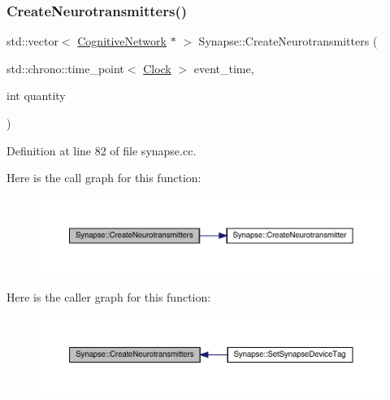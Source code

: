 \subsubsection{\texorpdfstring{Create\+Neurotransmitters()}{CreateNeurotransmitters()}}
{\footnotesize\ttfamily std\+::vector$<$ \hyperlink{class_cognitive_network}{Cognitive\+Network} $\ast$ $>$ Synapse\+::\+Create\+Neurotransmitters (\begin{DoxyParamCaption}\item[{std\+::chrono\+::time\+\_\+point$<$ \hyperlink{universe_8h_a0ef8d951d1ca5ab3cfaf7ab4c7a6fd80}{Clock} $>$}]{event\+\_\+time,  }\item[{int}]{quantity }\end{DoxyParamCaption})}



Definition at line 82 of file synapse.\+cc.

Here is the call graph for this function\+:\nopagebreak
\begin{figure}[H]
\begin{center}
\leavevmode
\includegraphics[width=350pt]{class_synapse_a593c70925fb80b880c6a01f2f252eb22_cgraph}
\end{center}
\end{figure}
Here is the caller graph for this function\+:\nopagebreak
\begin{figure}[H]
\begin{center}
\leavevmode
\includegraphics[width=350pt]{class_synapse_a593c70925fb80b880c6a01f2f252eb22_icgraph}
\end{center}
\end{figure}
\mbox{\label{class_synapse_a8d53488bdd8f0bd97216e5d388df35b8}} 
